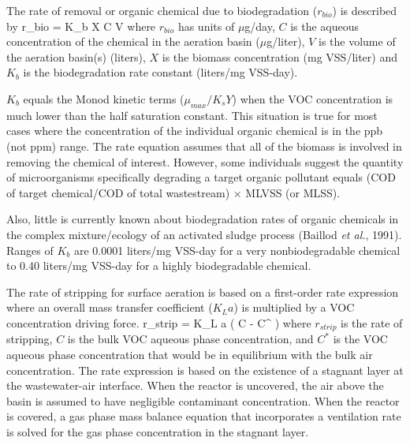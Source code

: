 
The rate of removal or organic chemical due to biodegradation ($r_{bio}$) is
described by
\mb
r_{bio} = K_b X C V
\mef
where $r_{bio}$ has units of $\mu$g/day, $C$ is the aqueous
concentration of the chemical in the aeration basin ($\mu$g/liter),
$V$ is the volume of the aeration basin(s) (liters), $X$ is the
biomass concentration (mg VSS/liter) and $K_b$ is the biodegradation
rate constant (liters/mg VSS-day).

$K_b$ equals the Monod kinetic terms ($\mu_{max} / K_s Y$) when the
VOC concentration is much lower than the half saturation constant.
This situation is true for most cases where the concentration of the
individual organic chemical is in the ppb (not ppm) range.  The rate
equation assumes that all of the biomass is involved in removing the
chemical of interest.  However, some individuals suggest the quantity
of microorganisms specifically degrading a target organic pollutant
equals (COD of target chemical/COD of total wastestream) $\times$
MLVSS (or MLSS).

Also, little is currently known about biodegradation rates of organic
chemicals in the complex mixture/ecology of an activated sludge
process (Baillod {\it et al.}, 1991).  Ranges of $K_b$ are 0.0001
liters/mg VSS-day for a very nonbiodegradable chemical to 0.40
liters/mg VSS-day for a highly biodegradable chemical.


The rate of stripping for surface aeration is based on a first-order rate
expression where an overall mass transfer coefficient ($K_L a$) is multiplied
by a VOC concentration driving force.  
\mb
r_{strip} = K_L a ( C - C^{\ast} )
\mef
where $r_{strip}$ is the rate of stripping, $C$ is the bulk VOC aqueous phase
concentration, and $C^{\ast}$ is the VOC aqueous phase concentration that would
be in equilibrium with the bulk air concentration.  The rate expression is
based on the existence of a stagnant layer at the wastewater-air interface.
When the reactor is uncovered, the air above the basin is assumed to have
negligible contaminant concentration.  When the reactor is covered, a gas phase
mass balance equation that incorporates a ventilation rate is solved for the
gas phase concentration in the stagnant layer.  

